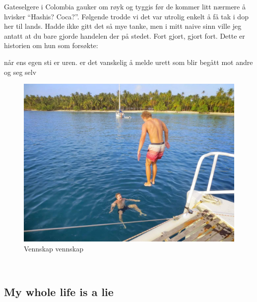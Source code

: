 Gateselgere i Colombia gauker om røyk og tyggis før de kommer litt
nærmere å hvisker ``Hashis? Coca?''.  Følgende trodde vi det var
utrolig enkelt å få tak i dop her til lands. Hadde ikke gitt det så
mye tanke, men i mitt naive sinn ville jeg antatt at du bare gjorde
handelen der på stedet. Fort gjort, gjort fort. Dette er historien om
hun som forsøkte:

når ens egen sti er uren. 
er det vanskelig å melde urett som blir begått mot andre og seg selv
\begin{figure}[h]
	\centering
	\includegraphics[width=\textwidth]{vennskapvol2}
	\caption*{Vennskap vennskap}
	\label{fig:vennskap}
\end{figure}



\begin{figure}[H]
\end{figure}

\\
\subsection*{My whole life is a lie}

